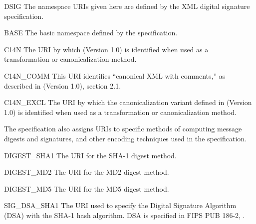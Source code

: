 \documentclass{howto}
\begin{document}
\begin{classdesc*}{DSIG}
  The namespace URIs given here are defined by the XML digital
  signature specification.

  \begin{memberdesc}{BASE}
    The basic namespace defined by the specification.
  \end{memberdesc}

  \begin{memberdesc}{C14N}
    The URI by which
     (Version
    1.0) is identified when used as a transformation or
    canonicalization method.
  \end{memberdesc}

  \begin{memberdesc}{C14N_COMM}
    This URI identifies ``canonical XML with comments,'' as described
    in 
    (Version 1.0), section 2.1.
  \end{memberdesc}

  \begin{memberdesc}{C14N_EXCL}
    The URI by which the canonicalization variant defined in
     (Version 1.0) is identified when used as a
    transformation or canonicalization method.
  \end{memberdesc}

  The specification also assigns URIs to specific methods of computing
  message digests and signatures, and other encoding techniques used
  in the specification.

  \begin{memberdesc}{DIGEST_SHA1}
    The URI for the SHA-1 digest method.
  \end{memberdesc}

  \begin{memberdesc}{DIGEST_MD2}
    The URI for the MD2 digest method.
  \end{memberdesc}

  \begin{memberdesc}{DIGEST_MD5}
    The URI for the MD5 digest method.
  \end{memberdesc}

  \begin{memberdesc}{SIG_DSA_SHA1}
    The URI used to specify the Digital Signature Algorithm (DSA) with
    the SHA-1 hash algorithm.  DSA is specified in FIPS PUB 186-2,
    .
  \end{memberdesc}


\end{classdesc*}
\end{document}
